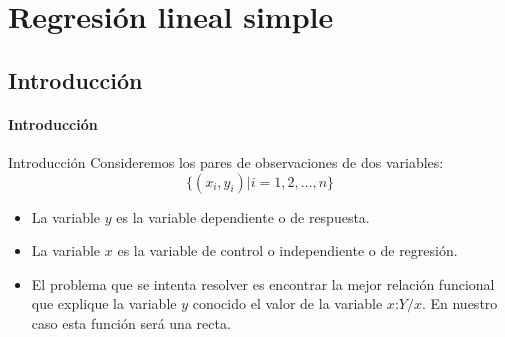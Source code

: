 




\chapter{Regresión lineal simple}

\section{Introducción}


\begin{frame}



\frametitle{Introducción}



\begin{block}{Introducción}
 {Consideremos los pares de observaciones de dos variables:$$\{(x_i,y_i)| i=1,2,\ldots,n\}$$}
\begin{itemize}
\item<3-> La variable $y$ es la variable dependiente o de respuesta.

\item<4-> La variable $x$ es la variable de control o
independiente o de regresión.

\item<5-> El problema que se intenta resolver es encontrar la mejor relación
funcional que explique la variable $y$ conocido el valor de la
variable $x$:$Y/x$. En nuestro caso esta función será una recta.
\end{itemize}
\end{block}
\end{frame}

